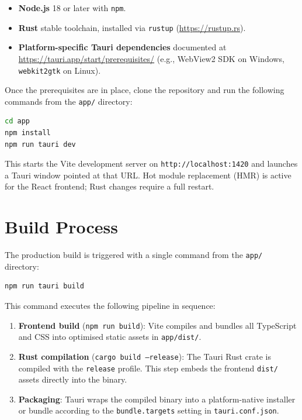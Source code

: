 \documentclass[12pt, a4paper]{report}
\begin{document}
	\begin{itemize}
		\item \textbf{Node.js} 18 or later with \texttt{npm}.
		\item \textbf{Rust} stable toolchain, installed via \texttt{rustup}
		      (\url{https://rustup.rs}).
		\item \textbf{Platform-specific Tauri dependencies} documented at
		      \url{https://tauri.app/start/prerequisites/} (e.g., WebView2 SDK
		      on Windows, \texttt{webkit2gtk} on Linux).
	\end{itemize}

	Once the prerequisites are in place, clone the repository and run the
	following commands from the \texttt{app/} directory:

	\begin{lstlisting}[language=bash, caption={Install dependencies and start the development server}]
cd app
npm install
npm run tauri dev
	\end{lstlisting}

	This starts the Vite development server on \texttt{http://localhost:1420}
	and launches a Tauri window pointed at that URL. Hot module replacement
	(HMR) is active for the React frontend; Rust changes require a full restart.

	\section{Build Process}
	The production build is triggered with a single command from the \texttt{app/}
	directory:

	\begin{lstlisting}[language=bash, caption={Production build command}]
npm run tauri build
	\end{lstlisting}

	This command executes the following pipeline in sequence:

	\begin{enumerate}
		\item \textbf{Frontend build} (\texttt{npm run build}): Vite compiles and
		      bundles all TypeScript and CSS into optimised static assets in
		      \texttt{app/dist/}.
		\item \textbf{Rust compilation} (\texttt{cargo build --release}): The Tauri
		      Rust crate is compiled with the \texttt{release} profile. This step
		      embeds the frontend \texttt{dist/} assets directly into the binary.
		\item \textbf{Packaging}: Tauri wraps the compiled binary into a
		      platform-native installer or bundle according to the
		      \texttt{bundle.targets} setting in \texttt{tauri.conf.json}.
	\end{enumerate}
\end{document}
